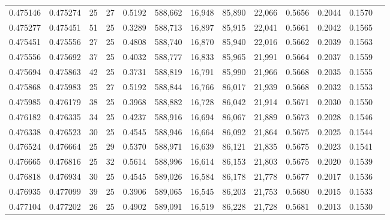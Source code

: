 \begin{tabular}{rrrrrrrrrrrrr}
0.475146 & 0.475274 &    25 &  27 &                                     0.5192 & 588,662 &  16,948 &  85,890 &  22,066 & 0.5656 & 0.2044 & 0.1570 \\
0.475277 & 0.475451 &    51 &  25 &                                     0.3289 & 588,713 &  16,897 &  85,915 &  22,041 & 0.5661 & 0.2042 & 0.1565 \\
0.475451 & 0.475556 &    27 &  25 &                                     0.4808 & 588,740 &  16,870 &  85,940 &  22,016 & 0.5662 & 0.2039 & 0.1563 \\
0.475556 & 0.475692 &    37 &  25 &                                     0.4032 & 588,777 &  16,833 &  85,965 &  21,991 & 0.5664 & 0.2037 & 0.1559 \\
0.475694 & 0.475863 &    42 &  25 &                                     0.3731 & 588,819 &  16,791 &  85,990 &  21,966 & 0.5668 & 0.2035 & 0.1555 \\
0.475868 & 0.475983 &    25 &  27 &                                     0.5192 & 588,844 &  16,766 &  86,017 &  21,939 & 0.5668 & 0.2032 & 0.1553 \\
0.475985 & 0.476179 &    38 &  25 &                                     0.3968 & 588,882 &  16,728 &  86,042 &  21,914 & 0.5671 & 0.2030 & 0.1550 \\
0.476182 & 0.476335 &    34 &  25 &                                     0.4237 & 588,916 &  16,694 &  86,067 &  21,889 & 0.5673 & 0.2028 & 0.1546 \\
0.476338 & 0.476523 &    30 &  25 &                                     0.4545 & 588,946 &  16,664 &  86,092 &  21,864 & 0.5675 & 0.2025 & 0.1544 \\
0.476524 & 0.476664 &    25 &  29 &                                     0.5370 & 588,971 &  16,639 &  86,121 &  21,835 & 0.5675 & 0.2023 & 0.1541 \\
0.476665 & 0.476816 &    25 &  32 &                                     0.5614 & 588,996 &  16,614 &  86,153 &  21,803 & 0.5675 & 0.2020 & 0.1539 \\
0.476818 & 0.476934 &    30 &  25 &                                     0.4545 & 589,026 &  16,584 &  86,178 &  21,778 & 0.5677 & 0.2017 & 0.1536 \\
0.476935 & 0.477099 &    39 &  25 &                                     0.3906 & 589,065 &  16,545 &  86,203 &  21,753 & 0.5680 & 0.2015 & 0.1533 \\
0.477104 & 0.477202 &    26 &  25 &                                     0.4902 & 589,091 &  16,519 &  86,228 &  21,728 & 0.5681 & 0.2013 & 0.1530 \\

\end{tabular}
